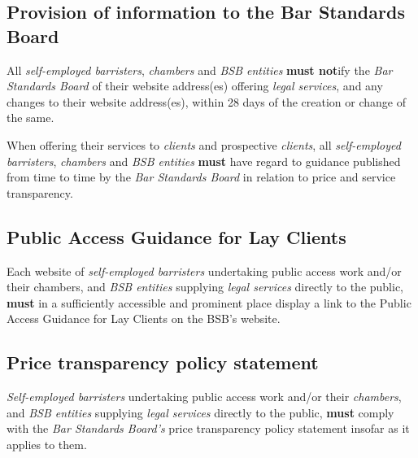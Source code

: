 \subsection{Provision of information to the Bar Standards Board}


All \emph{self-employed barristers}, \emph{chambers} and \emph{BSB
entities} \textcolor{myred}{\textbf{must not}}ify the \emph{Bar Standards Board} of their website
address(es) offering \emph{legal services}, and any changes to their
website address(es), within 28 days of the creation or change of the
same.



When offering their services to \emph{clients} and prospective
\emph{clients}, all \emph{self-employed barristers}, \emph{chambers} and
\emph{BSB entities} \textcolor{myred}{\textbf{must}} have regard to guidance published from time to
time by the \emph{Bar Standards Board} in relation to price and service
transparency.



\subsection{Public Access Guidance for Lay Clients}


Each website of \emph{self-employed barristers} undertaking public
access work and/or their chambers, and \emph{BSB entities} supplying
\emph{legal services} directly to the public, \textcolor{myred}{\textbf{must}} in a sufficiently
accessible and prominent place display a link to the Public Access
Guidance for Lay Clients on the BSB's website.

\subsection{Price transparency policy statement}


\emph{Self-employed barristers} undertaking public access work and/or
their \emph{chambers}, and \emph{BSB entities} supplying \emph{legal
services} directly to the public, \textcolor{myred}{\textbf{must}} comply with the \emph{Bar
Standards Board's} price transparency policy statement insofar as it
applies to them.

